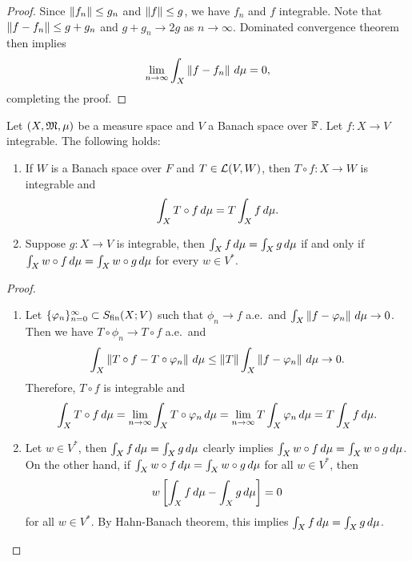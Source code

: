 \documentclass[a4paper]{article}
\renewcommand{\seqinfn}[1]{\{ #1 \}_{n=0}^\infty}
\begin{document}
\begin{proof}
  Since $\left\lVert f_n\right\rVert \leq g_n$ and $\left\lVert f\right\rVert \leq g$, we have $f_n$ and $f$
  integrable. Note that $\left\lVert f - f_n\right\rVert \leq g + g_n$ and $g + g_n \to 2g$
  as $n \to \infty$. Dominated convergence theorem then implies
  \[
    \lim_{n \to \infty} \int_X \left\lVert f - f_n\right\rVert \, d \mu = 0,
  \]
  completing the proof.
\end{proof}

\begin{prop}
  Let $(X, \mathfrak{M}, \mu)$ be a measure space and $V$ a Banach space over $\mathbb{F}$.
  Let $f : X \to V$ integrable. The following holds:
  \begin{enumerate}
    \item If $W$ is a Banach space over $F$ and $T \in \mathcal{L}(V, W)$, then $T
          \circ f: X \to W$ is integrable and
          \[
            \int_X T \circ f \, d \mu = T \int_X f \, d \mu.
          \]

    \item Suppose $g : X \to V$ is integrable, then $\int_X f \, d \mu =
          \int_X g \, d \mu$ if and only if $\int_X w \circ f \, d \mu =
          \int_X w \circ g \, d \mu$ for every $w \in V^*$.
  \end{enumerate}
\end{prop}

\begin{proof}
  \begin{enumerate}
    \item Let $\seqinfn{\phi_n} \subset \Sfin(X ; V)$ such that $\phi_n
          \to f$ a.e.\ and $\int_X \left\lVert f - \varphi_n\right\rVert \, d \mu \to 0$. Then
          we have $T \circ \phi_n \to T \circ f$ a.e.\ and
          \[
            \int_X \left\lVert T \circ f - T \circ \varphi_n\right\rVert \, d \mu
            \leq \left\lVert T\right\rVert \int_X \left\lVert f - \varphi_n\right\rVert \, d \mu \to 0.
          \]
          Therefore, $T \circ f$ is integrable and
          \[
            \int_X T \circ f \, d \mu = \lim_{n \to \infty}
            \int_X T \circ \varphi_n \, d \mu
            = \lim_{n \to \infty} T \int_X \varphi_n \, d \mu
            = T \int_X f \, d \mu.
          \]

    \item Let $w \in V^*$, then $\int_X f \, d \mu = \int_X g \, d \mu$
          clearly implies $\int_X w \circ f \, d \mu = \int_X w \circ g \, d
          \mu$. On the other hand, if $\int_X w \circ f \, d \mu = \int_X w
          \circ g \, d \mu$ for all $w \in V^*$, then
          \[
            w \left[ \int_X f \, d \mu - \int_X g \, d \mu \right] = 0
          \]
          for all $w \in V^*$. By Hahn-Banach theorem, this implies
          $\int_X f \, d \mu = \int_X g \, d \mu$.
  \end{enumerate}
\end{proof}
\end{document}
